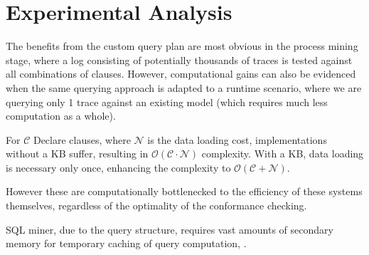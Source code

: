 \section{Experimental Analysis}
The benefits from the custom query plan are most obvious in the process mining stage, where a log consisting of potentially thousands of traces is tested against all combinations of clauses. However, computational gains can also be evidenced when the same querying approach is adapted to a runtime scenario, where we are querying only 1 trace against an existing model (which requires much less computation as a whole).

For $\mathcal{C}$ Declare clauses, where $\mathcal{N}$ is the data loading cost, implementations without a KB suffer, resulting in $\mathcal{O(C \cdot N)}$ complexity. With a KB, data loading is necessary only once, enhancing the complexity to $\mathcal{O(C + N)}$.

However these are computationally bottlenecked to the efficiency of these systems themselves, regardless of the optimality of the conformance checking.

SQL miner, due to the query structure, requires vast amounts of secondary memory for temporary caching of query computation, .